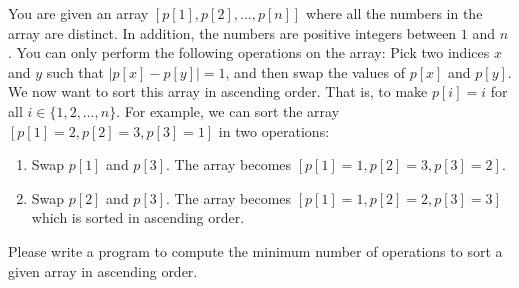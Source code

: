 You are given an array $[p[1], p[2], ..., p[n]]$ where
all the numbers in the array are distinct.
In addition, the numbers are positive integers between $1$ and $n$.
You can only perform the following operations on the array:
Pick two indices $x$ and $y$ such that $|p[x] - p[y]| = 1$, 
and then swap the values of $p[x]$ and $p[y]$.
We now want to sort this array in ascending order. 
That is, to make $p[i] = i$ for all $i\in\{1,2,\dots,n\}$.
For example, we can sort the array $[p[1]=2,p[2]=3,p[3]=1]$ in two operations:
\begin{enumerate}
\item Swap $p[1]$ and $p[3]$. The array becomes $[p[1]=1,p[2]=3,p[3]=2]$.
\item Swap $p[2]$ and $p[3]$. The array becomes $[p[1]=1,p[2]=2,p[3]=3]$ which
is sorted in ascending order.
\end{enumerate}

Please write a program to compute the minimum number of operations to
sort a given array in ascending order.
